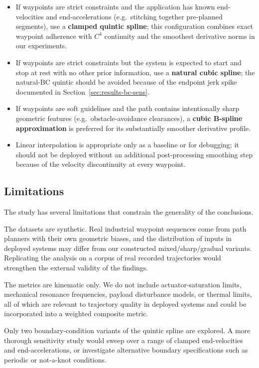 \begin{itemize}[leftmargin=*]
\item If waypoints are strict constraints and the application has
known end-velocities and end-accelerations (e.g.\ stitching together
pre-planned segments), use a \textbf{clamped quintic spline}; this
configuration combines exact waypoint adherence with $C^4$
continuity and the smoothest derivative norms in our experiments.
\item If waypoints are strict constraints but the system is expected
to start and stop at rest with no other prior information, use a
\textbf{natural cubic spline}; the natural-BC quintic should be
avoided because of the endpoint jerk spike documented in
Section~\ref{sec:results-bc-sens}.
\item If waypoints are soft guidelines and the path contains
intentionally sharp geometric features (e.g.\ obstacle-avoidance
clearances), a \textbf{cubic B-spline approximation} is preferred for
its substantially smoother derivative profile.
\item Linear interpolation is appropriate only as a baseline or for
debugging; it should not be deployed without an additional
post-processing smoothing step because of the velocity discontinuity
at every waypoint.
\end{itemize}

\subsection{Limitations}
\label{sec:limitations}

The study has several limitations that constrain the generality of
the conclusions.

The datasets are synthetic. Real industrial waypoint sequences come
from path planners with their own geometric biases, and the
distribution of inputs in deployed systems may differ from our
constructed mixed/sharp/gradual variants. Replicating the analysis
on a corpus of real recorded trajectories would strengthen the
external validity of the findings.

The metrics are kinematic only. We do not include actuator-saturation
limits, mechanical resonance frequencies, payload disturbance
models, or thermal limits, all of which are relevant to trajectory
quality in deployed systems and could be incorporated into a
weighted composite metric.

Only two boundary-condition variants of the quintic spline are
explored. A more thorough sensitivity study would sweep over a
range of clamped end-velocities and end-accelerations, or
investigate alternative boundary specifications such as periodic or
not-a-knot conditions.

